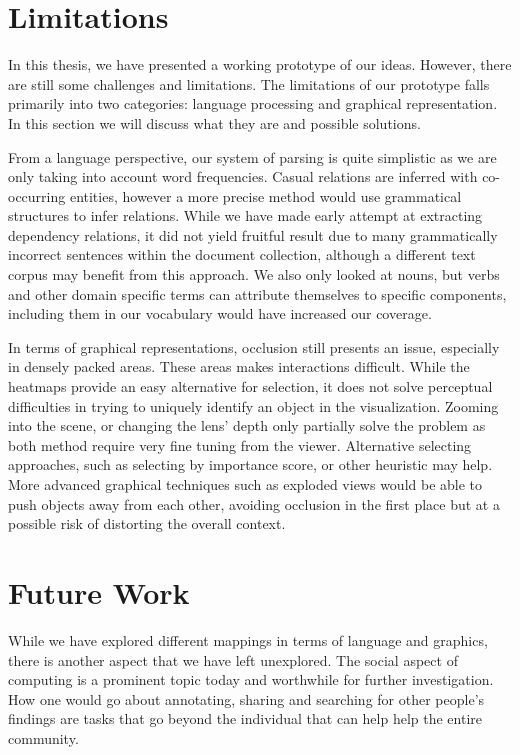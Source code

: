 \section{Limitations}
In this thesis, we have presented a working prototype of our ideas. However,
there are still some challenges and limitations. The limitations of our
prototype falls primarily into two categories: language processing and graphical
representation. In this section we will discuss what they are and possible
solutions.

From a language perspective, our system of parsing is quite simplistic as we are
only taking into account word frequencies. Casual relations are inferred with
co-occurring entities, however a more precise method would use grammatical
structures to infer relations. While we have made early attempt at extracting
dependency relations, it did not yield fruitful result due to many grammatically
incorrect sentences within the document collection, although a different text
corpus may benefit from this approach. We also only looked at nouns, but verbs
and other domain specific terms can attribute themselves to specific components,
including them in our vocabulary would have increased our coverage.

In terms of graphical representations, occlusion still presents an issue,
especially in densely packed areas. These areas makes interactions difficult.
While the heatmaps provide an easy alternative for selection, it does not solve
perceptual difficulties in trying to uniquely identify an object in the
visualization. Zooming into the scene, or changing the lens' depth only
partially solve the problem as both method require very fine tuning from the
viewer. Alternative selecting approaches, such as selecting by importance score,
or other heuristic may help. More advanced graphical techniques such as exploded
views would be able to push objects away from each other, avoiding occlusion in
the first place but at a possible risk of distorting the overall context.


\section{Future Work}
While we have explored different mappings in terms of language and graphics,
there is another aspect that we have left unexplored. The social aspect of
computing is a prominent topic today and worthwhile for further investigation.
How one would go about annotating, sharing and searching for other people's
findings are tasks that go beyond the individual that can help help the entire
community.

